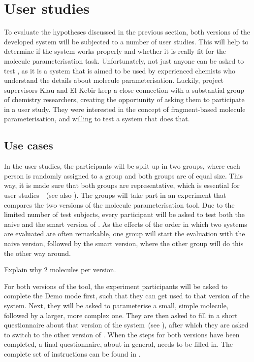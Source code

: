 \section{User studies}
To evaluate the hypotheses discussed in the previous section, both versions of the developed system will be subjected to a number of user studies. This will help to determine if the system works properly and whether it is really fit for the molecule parameterisation task. Unfortunately, not just anyone can be asked to test \oframp, as it is a system that is aimed to be used by experienced chemists who understand the details about molecule parameterisation. Luckily, project supervisors Klau and El-Kebir keep a close connection with a substantial group of chemistry researchers, creating the opportunity of asking them to participate in a user study. They were interested in the concept of fragment-based molecule parameterisation, and willing to test a system that does that.


\subsection{Use cases}
In the user studies, the participants will be split up in two groups, where each person is randomly assigned to a group and both groups are of equal size. This way, it is made sure that both groups are representative, which is essential for user studies~\cite{wohlin2003empirical}~(see also ). The groups will take part in an experiment that compares the two versions of the molecule parameterisation tool. Due to the limited number of test subjects, every participant will be asked to test both the naive and the smart version of \oframp. As the effects of the order in which two systems are evaluated are often remarkable, one group will start the evaluation with the naive version, followed by the smart version, where the other group will do this the other way around.

\begin{todo}
\item Explain why 2 molecules per version.
\end{todo}

For both versions of the tool, the experiment participants will be asked to complete the Demo mode first, such that they can get used to that version of the system. Next, they will be asked to parameterise a small, simple molecule, followed by a larger, more complex one. They are then asked to fill in a short questionnaire about that version of the system~(see ), after which they are asked to switch to the other version of \oframp. When the steps for both versions have been completed, a final questionnaire, about \oframp{} in general, needs to be filled in. The complete set of instructions can be found in .

